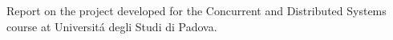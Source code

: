Report on the project developed for the Concurrent and Distributed Systems
course at Universit\'a degli Studi di Padova.
